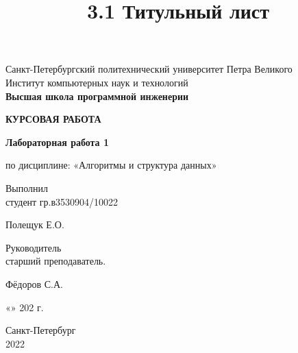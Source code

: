 \documentclass[a4paper,12pt]{article}
\begin{document}
\begin{titlepage}
\title{3.1 Титульный лист}

\begin{center}
	Санкт-Петербургский политехнический университет Петра Великого\\
	Институт компьютерных наук и технологий\\
	\bfseries{Высшая школа программной инженерии}
\end{center}

\vspace{20ex} 

\begin{center}
	\begin{huge} {\MakeUppercase{\bfseries{\scshape курсовая работа}}} \end{huge}
	
	\vspace{3ex}
	
	{\bfseries Лабораторная работа 1}
	
	по дисциплине: «Алгоритмы и структура данных»
\end{center}

\vspace{30ex}

\noindent Выполнил\\
студент гр.в3530904/10022\hfill \begin{minipage}{0.6\textwidth} \hfill Полещук Е.О.\end{minipage}

\vspace{3ex}

\noindent Руководитель\\
старший преподаватель.\hfill \begin{minipage} {0.6\textwidth}\hfill Фёдоров С.А.\end{minipage}

\vspace{3ex}

\hfill \begin{minipage}{0.6\textwidth} \hfill «\underline{\hspace{0.1cm 23}}»\underline{\hspace{0.1cm мая}} 202\underline{\hspace{0.1cm 2}} г.\end{minipage}

\vfill

\begin{center}
	Санкт-Петербург\\ 
	2022
\end{center}
\end{titlepage}
\setcounter{page}{2}
\end{document}
